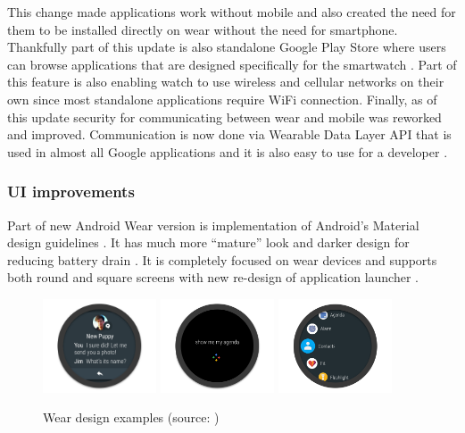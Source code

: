 This change made applications work without mobile and also created the need for them to be installed directly on wear without the need for smartphone. Thankfully part of this update is also standalone Google Play Store where users can browse applications that are designed specifically for the smartwatch \cite{AW2WN}. Part of this feature is also enabling watch to use wireless and cellular networks on their own since most standalone applications require WiFi connection. Finally, as of this update security for communicating between wear and mobile was reworked and improved. Communication is now done via Wearable Data Layer API that is used in almost all Google applications and it is also easy to use for a developer \cite{AW2UG}. 

\subsubsection{UI improvements}\label{sec:UIImprovements}
Part of new Android Wear version is implementation of Android's Material design guidelines \cite{DoAW}. It has much more \enquote{mature} look and darker design for reducing battery drain \cite{AW2WN}. It is completely focused on wear devices and supports both round and square screens with new re-design of application launcher \cite{AW2UG}.

\begin{figure}[H]
	\begin{centering}
		\includegraphics[width=0.3\textwidth]{img/wear_design_notification}
		\includegraphics[width=0.3\textwidth]{img/wear_design_agenda}
		\includegraphics[width=0.3\textwidth]{img/wear_design_menu}
		\par\end{centering}
	\caption{Wear design examples (source: \cite{DoAW})\label{fig:WearDesignExamples}}
	\label{fig03c04}
\end{figure}

